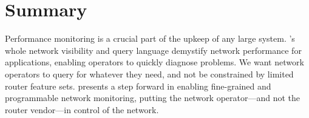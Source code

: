 \section{Summary}
\label{sec:conclusion}

Performance monitoring is a crucial part of the upkeep of any large system.
\TheSystem's whole network visibility and query language demystify network
performance for applications, enabling operators to quickly diagnose problems.
We want network operators to query for whatever they need, and not be
constrained by limited router feature sets. \TheSystem presents a step forward
in enabling fine-grained and programmable network monitoring, putting the
network operator---and not the router vendor---in control of the network.
